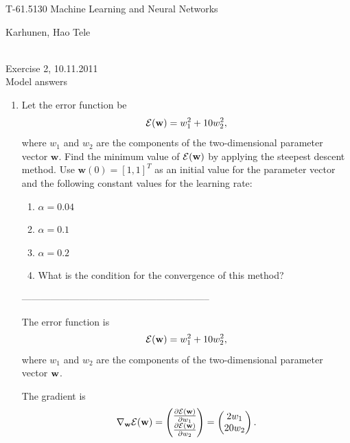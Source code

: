 \documentclass[10pt]{article}
\newcommand{\vw}{{\bf{w}}}
\begin{document}
\pagestyle{empty}
\begin{Large}
\begin{bf} 
T-61.5130 Machine Learning and Neural Networks\\ 
\end{bf}
\end{Large}
Karhunen, Hao Tele\\  
\\
\begin{large}
\begin{bf}
Exercise 2,  10.11.2011\\Model answers
\end{bf}
\end{large}
\begin{enumerate}

\item Let the error function be
\begin{equation*}
{\cal E}(\mathbf{w})=w_1^2+10w_2^2,
\end{equation*}
where $w_1$ and $w_2$ are the components of the two-dimensional
parameter vector $\mathbf{w}$. Find the minimum value of ${\cal
E}(\mathbf{w})$ by applying the steepest descent method. Use
$\mathbf{w}(0)=[1,1]^T$ as an initial value for the parameter vector
and the following constant values for the learning rate:
\begin{enumerate} \item $\alpha=0.04$ \item $\alpha=0.1$ \item
$\alpha=0.2$
\item What is the condition for the convergence of this method?
\end{enumerate}

-----------------------------------------------------------

The error function is
\begin{equation*}
{\cal E}(\vw)=w_1^2+10w_2^2,
\end{equation*}
where $w_1$ and $w_2$ are the components of the two-dimensional
parameter vector $\vw$. 

The gradient is
\begin{equation*}
  \nabla_{\vw} {\cal E} (\vw) = \begin{pmatrix} \frac{\partial {\cal E}
      (\vw)}{\partial w_1} \\  \frac{\partial  {\cal E} (\vw) }{\partial
      w_2}\end{pmatrix} = \begin{pmatrix} 2 w_1 \\  20 w_2 \end{pmatrix}.
\end{equation*}


\end{enumerate}
\end{document}
